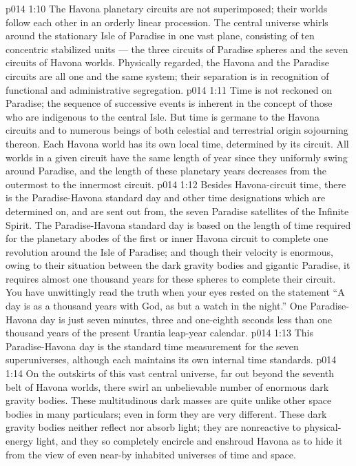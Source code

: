 \vs p014 1:10 The Havona planetary circuits are not superimposed; their worlds follow each other in an orderly linear procession. The central universe whirls around the stationary Isle of Paradise in one vast plane, consisting of ten concentric stabilized units --- the three circuits of Paradise spheres and the seven circuits of Havona worlds. Physically regarded, the Havona and the Paradise circuits are all one and the same system; their separation is in recognition of functional and administrative segregation.
\vs p014 1:11 \pc Time is not reckoned on Paradise; the sequence of successive events is inherent in the concept of those who are indigenous to the central Isle. But time is germane to the Havona circuits and to numerous beings of both celestial and terrestrial origin sojourning thereon. Each Havona world has its own local time, determined by its circuit. All worlds in a given circuit have the same length of year since they uniformly swing around Paradise, and the length of these planetary years decreases from the outermost to the innermost circuit.
\vs p014 1:12 Besides Havona\hyp{}circuit time, there is the Paradise\hyp{}Havona standard day and other time designations which are determined on, and are sent out from, the seven Paradise satellites of the Infinite Spirit. The Paradise\hyp{}Havona standard day is based on the length of time required for the planetary abodes of the first or inner Havona circuit to complete one revolution around the Isle of Paradise; and though their velocity is enormous, owing to their situation between the dark gravity bodies and gigantic Paradise, it requires almost one thousand years for these spheres to complete their circuit. You have unwittingly read the truth when your eyes rested on the statement “A day is as a thousand years with God, as but a watch in the night.” One Paradise\hyp{}Havona day is just seven minutes, three and one\hyp{}eighth seconds less than one thousand years of the present Urantia leap\hyp{}year calendar.
\vs p014 1:13 This Paradise\hyp{}Havona day is the standard time measurement for the seven superuniverses, although each maintains its own internal time standards.
\vs p014 1:14 \pc On the outskirts of this vast central universe, far out beyond the seventh belt of Havona worlds, there swirl an unbelievable number of enormous dark gravity bodies. These multitudinous dark masses are quite unlike other space bodies in many particulars; even in form they are very different. These dark gravity bodies neither reflect nor absorb light; they are nonreactive to physical\hyp{}energy light, and they so completely encircle and enshroud Havona as to hide it from the view of even near\hyp{}by inhabited universes of time and space.
